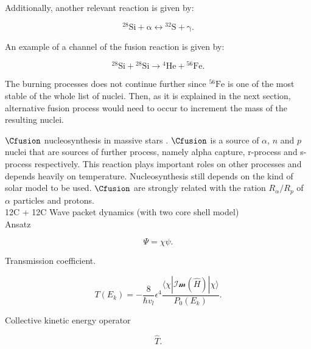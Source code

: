 \documentclass[openany]{book}
\begin{document}
Additionally, another relevant reaction is given by:

\begin{equation}\label{eq:reaction_S_equillibrium}
	\mathrm{{}^{28}Si+ \alpha \leftrightarrow {}^{32}S + \gamma}.
\end{equation}

An example of a channel of the fusion reaction is given by:


\begin{equation} \label{eq:reaction_28Sifusion_alpha56Fe}
	\mathrm{{}^{28}Si + {}^{28}Si \rightarrow {}^{4}He + {}^{56}Fe }.
\end{equation}

The burning processes does not continue further since $\mathrm{^{56}Fe }$ is one of the most stable of the whole list of nuclei. Then, as it is explained in the next section, alternative fusion process would need to occur to increment the mass of the resulting nuclei.

$\Cfusion$ nucleosynthesis in massive stars \cite{pignatari_hirschi_wiescher_gallino_bennett_beard_fryer_herwig_rockefeller_timmes_et_2012}. $\Cfusion$ is a source of $\alpha$, $n$ and $p$ nuclei that are sources of further process, namely alpha capture, r-process and s-process respectively. 
This reaction plays important roles on other processes and depends heavily on temperature. Nucleosynthesis still depends on the kind of solar model to be used. $\Cfusion$ are strongly related with the ration $R_\alpha/R_p$ of $\alpha$ particles and protons.\\

12C + 12C Wave packet dynamics (with two core shell model) \cite{diaz-torres_wiescher_2018} \\

Ansatz

\begin{equation}\label{eq:middleFusion_wavePacket_ansatz}
	\Psi = \chi \psi.
\end{equation}

Transmission coefficient.

\begin{equation}\label{eq:middleFusion_wavePacket_transmission}
	T(E_k) = - \frac{8}{\hbar v_l} \epsilon^4 \frac{\langle \chi  | \mathcal{Im}(\hat H) | \chi \rangle  }{P_0(E_k)}.
\end{equation}


Collective kinetic energy operator 

\begin{equation}\label{eq:middleFusion_wavePacket_collectiveKinetic}
	\hat T.
\end{equation}
\end{document}

